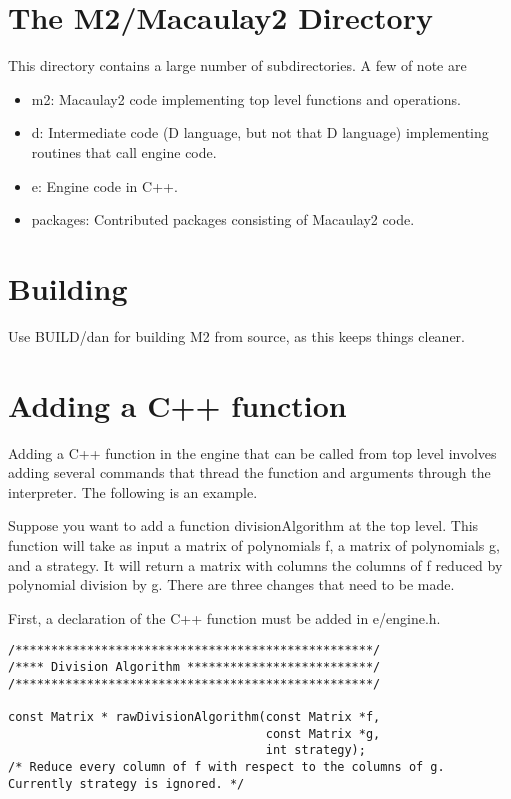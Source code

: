 \documentclass{article}
\begin{document}
\section{The M2/Macaulay2 Directory}

This directory contains a large number of subdirectories.
A few of note are
\begin{itemize}
\item m2: Macaulay2 code implementing top level functions and operations.
\item d: Intermediate code (D language, but not that D language) implementing routines that call engine code.
\item e: Engine code in C++.
\item packages: Contributed packages consisting of Macaulay2 code.
\end{itemize}

\section{Building}

Use BUILD/dan for building M2 from source, as this keeps things cleaner.

\section{Adding a C++ function}

Adding a C++ function in the engine that can be called from top level involves adding several commands that thread the function and arguments through the interpreter.
The following is an example.

Suppose you want to add a function divisionAlgorithm at the top level.
This function will take as input a matrix of polynomials f, a matrix of polynomials g, and a strategy.
It will return a matrix with columns the columns of f reduced by polynomial division by g.
There are three changes that need to be made.

First, a declaration of the C++ function must be added in e/engine.h.
\begin{verbatim}
/**************************************************/
/**** Division Algorithm **************************/
/**************************************************/

const Matrix * rawDivisionAlgorithm(const Matrix *f,
                                    const Matrix *g,
                                    int strategy);
/* Reduce every column of f with respect to the columns of g. Currently strategy is ignored. */
\end{verbatim}
\end{document}
